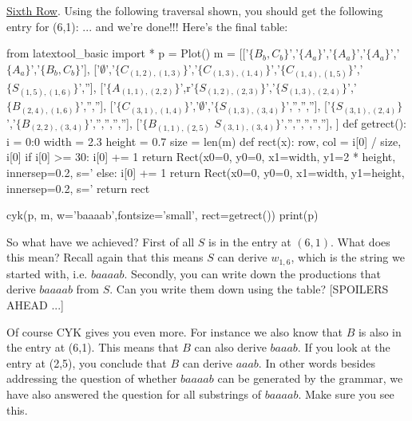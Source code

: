 \underline{Sixth Row}.
Using the following traversal shown, you should get the following entry for (6,1):
... and we're done!!! Here's the final table:
\begin{python}
from latextool_basic import *
p = Plot()
m = [['$\{B_b,C_b\}$','$\{A_a\}$','$\{A_a\}$','$\{A_a\}$','$\{A_a\}$','$\{B_b,C_b\}$'],
     ['$\emptyset$','$\{C_{(1,2),(1,3)}\}$','$\{C_{(1,3),(1,4)}\}$','$\{C_{(1,4),(1,5)}\}$','$\{S_{(1,5),(1,6)}\}$',''],
     ['$\{A_{(1,1),(2,2)}\}$',r'$\{S_{(1,2),(2,3)}\}$','$\{S_{(1,3),(2,4)}\}$','$\{B_{(2,4),(1,6)}\}$','',''],
     ['$\{C_{(3,1),(1,4)}\}$','$\emptyset$','$\{S_{(1,3),(3,4)}\}$','','',''],
     ['$\{S_{(3,1),(2,4)}\}$','$\{B_{(2,2),(3,4)}\}$','','','',''],
     ['$\{B_{(1,1),(2,5)}$ $S_{(3,1),(3,4)}\}$','','','','',''],
     ]
def getrect():
    i = {0:0}
    width = 2.3
    height = 0.7
    size = len(m)
    def rect(x):
        row, col = i[0] / size, i[0] %
        if i[0] >= 30:
            i[0] += 1
            return Rect(x0=0, y0=0, x1=width, y1=2 * height,
                            innersep=0.2,
                            s='%
        else:
            i[0] += 1
            return Rect(x0=0, y0=0, x1=width, y1=height,
                            innersep=0.2,
                            s='%
    return rect
    
cyk(p, m, w='baaaab',fontsize='small', rect=getrect())
print(p)
\end{python}


So what have we achieved? First of all $S$ is in the entry at $(6,1)$.
What does this mean? 
Recall again that this means $S$ can derive $w_{1,6}$, which is the
string we started with, i.e. $baaaab$.
Secondly, you can write down the productions that derive $baaaab$ from $S$.
Can you write them down using the table? [SPOILERS AHEAD ...]

Of course CYK gives you even more.
For instance we also know that $B$ is also in the entry at (6,1).
This means that $B$ can also derive $baaab$.
If you look at the entry at (2,5), you conclude that $B$ can derive $aaab$.
In other words besides addressing the question of whether $baaaab$ can be
generated by the grammar, we have also answered the question for all
substrings of $baaaab$.
Make sure you see this.

